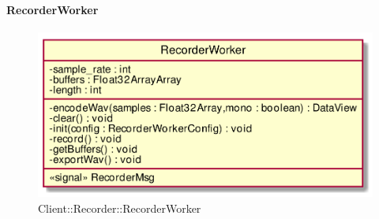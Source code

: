 \hypertarget{RecorderWorker_label}{\paragraph{RecorderWorker}}
\begin{figure}[h]
	\centering
	\includegraphics[width=\textwidth,height=\textheight,keepaspectratio]{images/ClassRecorderWorker.png}
	\caption{Client::Recorder::RecorderWorker}
\end{figure}
